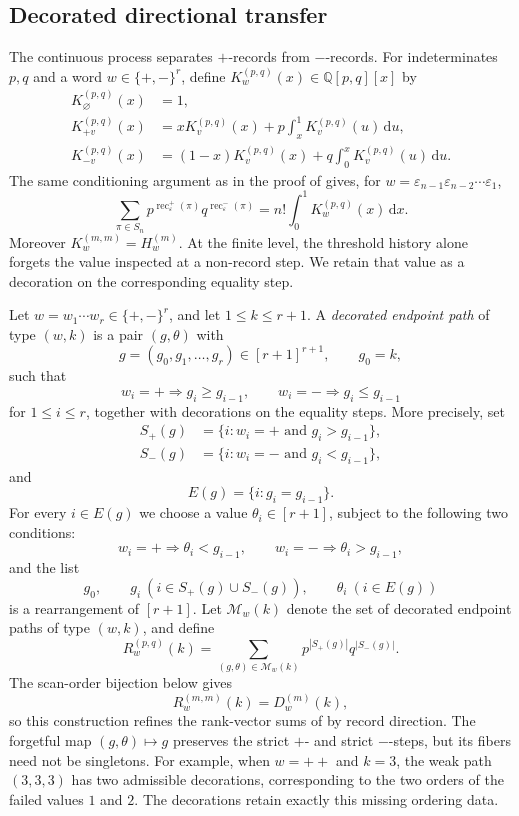 \documentclass[11pt,letterpaper,reqno]{amsart}
\theoremstyle{definition}
\DeclareMathOperator{\rec}{rec}
\newcommand{\dd}{\,\mathrm{d}}
\newcommand{\eps}{\varepsilon}
\begin{document}
\subsection{Decorated directional transfer}

The continuous process separates \(+\)-records from \(-\)-records.  For
indeterminates \(p,q\) and a word \(w\in\{+,-\}^r\), define
\(K_w^{(p,q)}(x)\in\mathbb Q[p,q][x]\) by
\begin{align*}
K_\varnothing^{(p,q)}(x)&=1,\\
K_{+v}^{(p,q)}(x)
&=xK_v^{(p,q)}(x)+p\int_x^1K_v^{(p,q)}(u)\dd u,\\
K_{-v}^{(p,q)}(x)
&=(1-x)K_v^{(p,q)}(x)+q\int_0^xK_v^{(p,q)}(u)\dd u.
\end{align*}
The same conditioning argument as in the proof of
 gives, for
\(w=\eps_{n-1}\eps_{n-2}\cdots\eps_1\),
\[
\sum_{\pi\in S_n}
p^{\rec_\eps^+(\pi)}q^{\rec_\eps^-(\pi)}
=
n!\int_0^1K_w^{(p,q)}(x)\dd x.
\]
Moreover \(K_w^{(m,m)}=H_w^{(m)}\).  At the finite level, the threshold
history alone forgets the value inspected at a non-record step.  We retain
that value as a decoration on the corresponding equality step.

Let \(w=w_1\cdots w_r\in\{+,-\}^r\), and let \(1\le k\le r+1\).  A
\emph{decorated endpoint path} of type \((w,k)\) is a pair \((g,\theta)\)
with
\[
g=(g_0,g_1,\ldots,g_r)\in[r+1]^{r+1},
\qquad g_0=k,
\]
such that
\[
w_i=+\Longrightarrow g_i\ge g_{i-1},
\qquad
w_i=-\Longrightarrow g_i\le g_{i-1}
\]
for \(1\le i\le r\), together with decorations on the equality steps.  More
precisely, set
\[
\begin{aligned}
S_+(g)&=\{i:w_i=+\text{ and }g_i>g_{i-1}\},\\
S_-(g)&=\{i:w_i=-\text{ and }g_i<g_{i-1}\},
\end{aligned}
\]
and
\[
E(g)=\{i:g_i=g_{i-1}\}.
\]
For every \(i\in E(g)\) we choose a value \(\theta_i\in[r+1]\), subject to
the following two conditions:
\[
w_i=+\Longrightarrow \theta_i<g_{i-1},
\qquad
w_i=-\Longrightarrow \theta_i>g_{i-1},
\]
and the list
\[
g_0,\qquad
g_i\ (i\in S_+(g)\cup S_-(g)),\qquad
\theta_i\ (i\in E(g))
\]
is a rearrangement of \([r+1]\).  Let \(\mathcal M_w(k)\) denote the set of
decorated endpoint paths of type \((w,k)\), and define
\[
R_w^{(p,q)}(k)
=
\sum_{(g,\theta)\in\mathcal M_w(k)}
p^{|S_+(g)|}q^{|S_-(g)|}.
\]
The scan-order bijection below gives
\[
R_w^{(m,m)}(k)=D_w^{(m)}(k),
\]
so this construction refines the rank-vector sums of
 by record direction.
The forgetful map \((g,\theta)\mapsto g\) preserves the strict \(+\)- and
strict \(-\)-steps, but its fibers need not be singletons.  For example, when
\(w=++\) and \(k=3\), the weak path \((3,3,3)\) has two admissible
decorations, corresponding to the two orders of the failed values \(1\) and
\(2\).  The decorations retain exactly this missing ordering data.
\end{document}
